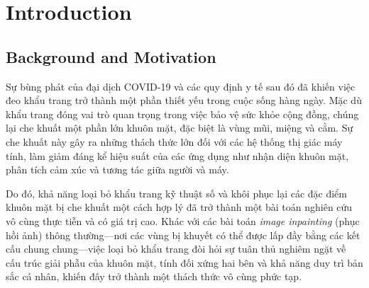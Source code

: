 \documentclass{ipgpmaster}
\begin{document}
\checkyears

\vspace*{5mm}



\def\author{Phan Dinh Trung - 20230093}
\def\title{Robust Adaptive Face Inpainting \\ (RAFI++)}
\def\shorttitle{RAFI++: Face Mask Removal}
\def\unit{\textit{Hanoi University of Science and Technology - SOICT}}
\def\course{\textit{Project II}}
\def\spe{} %
\def\supervisor{\textit{Prof. Dr. Huynh Quyet Thang}}
\def\mydate{\today}

\Entete

\vspace*{2cm}
\begin{abstract}
\end{abstract}

\newpage
\tableofcontents
\newpage

\section{Introduction}

\subsection{Background and Motivation}
Sự bùng phát của đại dịch COVID-19 và các quy định y tế sau đó đã khiến việc đeo khẩu trang trở thành một phần thiết yếu trong cuộc sống hàng ngày. Mặc dù khẩu trang đóng vai trò quan trọng trong việc bảo vệ sức khỏe cộng đồng, chúng lại che khuất một phần lớn khuôn mặt, đặc biệt là vùng mũi, miệng và cằm. Sự che khuất này gây ra những thách thức lớn đối với các hệ thống thị giác máy tính, làm giảm đáng kể hiệu suất của các ứng dụng như nhận diện khuôn mặt, phân tích cảm xúc và tương tác giữa người và máy. 

Do đó, khả năng loại bỏ khẩu trang kỹ thuật số và khôi phục lại các đặc điểm khuôn mặt bị che khuất một cách hợp lý đã trở thành một bài toán nghiên cứu vô cùng thực tiễn và có giá trị cao. Khác với các bài toán \textit{image inpainting} (phục hồi ảnh) thông thường—nơi các vùng bị khuyết có thể được lấp đầy bằng các kết cấu chung chung—việc loại bỏ khẩu trang đòi hỏi sự tuân thủ nghiêm ngặt về cấu trúc giải phẫu của khuôn mặt, tính đối xứng hai bên và khả năng duy trì bản sắc cá nhân, khiến đây trở thành một thách thức vô cùng phức tạp.
\end{document}
